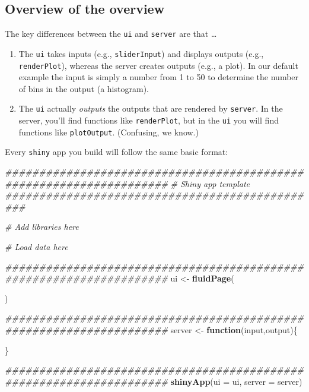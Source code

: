 \documentclass[]{book}
\newenvironment{Shaded}{\begin{snugshade}}{\end{snugshade}}
\newcommand{\CommentTok}[1]{\textcolor[rgb]{0.56,0.35,0.01}{\textit{#1}}}
\newcommand{\ControlFlowTok}[1]{\textcolor[rgb]{0.13,0.29,0.53}{\textbf{#1}}}
\newcommand{\DataTypeTok}[1]{\textcolor[rgb]{0.13,0.29,0.53}{#1}}
\newcommand{\KeywordTok}[1]{\textcolor[rgb]{0.13,0.29,0.53}{\textbf{#1}}}
\newcommand{\NormalTok}[1]{#1}
\newcommand{\StringTok}[1]{\textcolor[rgb]{0.31,0.60,0.02}{#1}}
\begin{document}
\hypertarget{overview-of-the-overview}{%
\subsection*{Overview of the overview}\label{overview-of-the-overview}}

The key differences between the \texttt{ui} and \texttt{server} are that \ldots{}

\begin{enumerate}
\def\labelenumi{(\arabic{enumi})}
\item
  The \texttt{ui} takes inputs (e.g., \texttt{sliderInput}) and displays outputs (e.g., \texttt{renderPlot}), whereas the server creates outputs (e.g., a plot). In our default example the input is simply a number from 1 to 50 to determine the number of bins in the output (a histogram).
\item
  The \texttt{ui} actually \emph{outputs} the outputs that are rendered by \texttt{server}. In the server, you'll find functions like \texttt{renderPlot}, but in the \texttt{ui} you will find functions like \texttt{plotOutput}. (Confusing, we know.)
\end{enumerate}

Every \texttt{shiny} app you build will follow the same basic format:

\begin{Shaded}
\begin{Highlighting}[]
\CommentTok{####################################################################}
\CommentTok{# Shiny app template ###############################################}

\CommentTok{# Add libraries here}

\CommentTok{# Load data here}

\CommentTok{####################################################################}
\NormalTok{ui <-}\StringTok{ }\KeywordTok{fluidPage}\NormalTok{(}

\NormalTok{)}

\CommentTok{####################################################################}
\NormalTok{server <-}\StringTok{ }\ControlFlowTok{function}\NormalTok{(input,output)\{}

\NormalTok{\}}

\CommentTok{####################################################################}
\KeywordTok{shinyApp}\NormalTok{(}\DataTypeTok{ui =}\NormalTok{ ui, }\DataTypeTok{server =}\NormalTok{ server)}
\end{Highlighting}
\end{Shaded}
\end{document}
